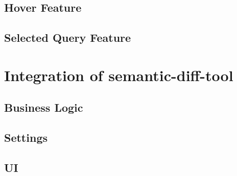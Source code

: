 \subsection{Hover Feature}
\subsection{Selected Query Feature}

\section{Integration of semantic-diff-tool}\label{sec:semantic-diff-integration}
\subsection{Business Logic}
\subsection{Settings}
\subsection{UI}
